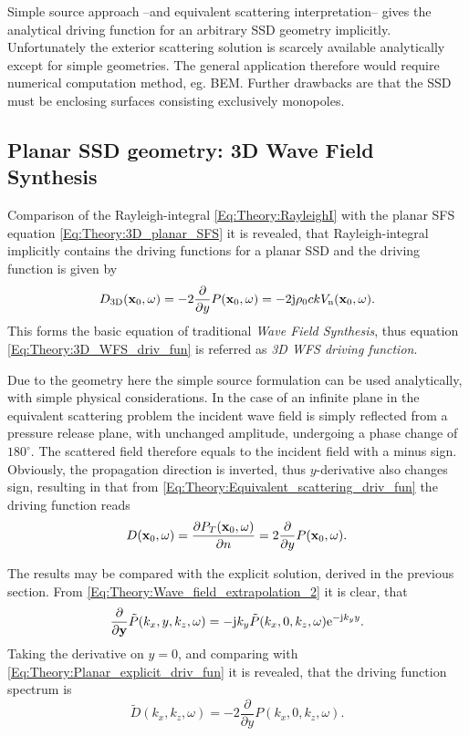 Simple source approach --and equivalent scattering interpretation-- gives the analytical driving function for an arbitrary SSD geometry implicitly. Unfortunately the exterior scattering solution is scarcely available analytically except for simple geometries. The general application therefore would require numerical computation method, eg. BEM. Further drawbacks are that the SSD must be enclosing surfaces consisting exclusively monopoles.

\subsection{Planar SSD geometry: 3D Wave Field Synthesis}

Comparison of the Rayleigh-integral \eqref{Eq:Theory:RayleighI} with the planar SFS equation \eqref{Eq:Theory:3D_planar_SFS} it is revealed, that Rayleigh-integral implicitly contains the driving functions for a planar SSD and the driving function is given by
\begin{equation}
D_{\mathrm{3D}}(\mathbf{x}_0,\omega) = -2\frac{\partial}{\partial y} P(\mathbf{x}_0,\omega) = - 2 \mathrm{j} \rho_0 c k V_{\mathrm{n}}(\mathbf{x}_0,\omega).
\label{Eq:Theory:3D_WFS_driv_fun}
\end{equation}
This forms the basic equation of traditional \emph{Wave Field Synthesis}, thus equation \eqref{Eq:Theory:3D_WFS_driv_fun} is referred as \emph{3D WFS driving function}.

Due to the geometry here the simple source formulation can be used analytically, with simple physical considerations.
In the case of an infinite plane in the equivalent scattering problem the incident wave field is simply reflected from a pressure release plane, with unchanged amplitude, undergoing a phase change of $180^{\circ}$.
The scattered field therefore equals to the incident field with a minus sign. Obviously, the propagation direction is inverted, thus $y$-derivative also changes sign, resulting in that from \eqref{Eq:Theory:Equivalent_scattering_driv_fun} the driving function reads
\begin{equation}
D(\mathbf{x}_0,\omega) = \frac{\partial P_T(\mathbf{x}_0,\omega)}{\partial n}
=
2\frac{\partial}{\partial y} P(\mathbf{x}_0,\omega).
\end{equation}

The results may be compared with the explicit solution, derived in the previous section. From \eqref{Eq:Theory:Wave_field_extrapolation_2} it is clear, that
\begin{equation}
\frac{\partial}{\partial \mathbf{y}} \tilde{P}(k_x,y,k_z,\omega) = -\mathrm{j} k_y \tilde{P}(k_x,0,k_z,\omega) \mathrm{e}^{- \mathrm{j} k_y y}.
\end{equation}
Taking the derivative on $y=0$, and comparing with \eqref{Eq:Theory:Planar_explicit_driv_fun} it is revealed, that the driving function spectrum is
\begin{equation}
\tilde{D}(k_x,k_z,\omega) = -2\frac{\partial}{\partial y} P(k_x,0,k_z,\omega).
\end{equation}

